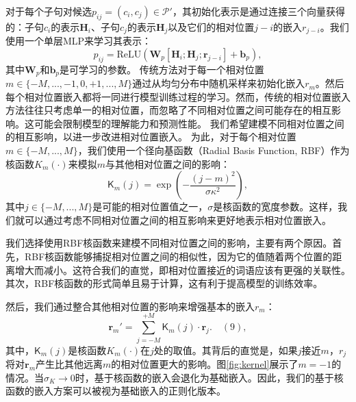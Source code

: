 对于每个子句对候选$p_{ij}=(c_i,c_j)\in\mathcal{P}'$，其初始化表示是通过连接三个向量获得的：子句$c_i$的表示$\boldsymbol{H}_i$、子句$c_j$的表示$\boldsymbol{H}_j$以及它们的相对位置$j-i$的嵌入$r_{j-i}$。我们使用一个单层MLP来学习其表示：
\vspace{3pt}  \begin{equation}
p_{ij}=\text{ReLU}(\boldsymbol{W}_p[\boldsymbol{H}_i;\boldsymbol{H}_j;\boldsymbol{r}_{j-i}]+\boldsymbol{b}_p),
\end{equation} \vspace{4pt}
其中$\boldsymbol{W}_p$和$\boldsymbol{b}_p$是可学习的参数。
传统方法对于每一个相对位置$m\in\{-M,...,-1,0,+1,...,M\}$通过从均匀分布中随机采样来初始化嵌入$r_m$。然后每个相对位置嵌入都将一同进行模型训练过程的学习。然而，传统的相对位置嵌入方法往往只考虑单一的相对位置，而忽略了不同相对位置之间可能存在的相互影响。这可能会限制模型的理解能力和预测性能。
我们希望建模不同相对位置之间的相互影响，以进一步改进相对位置嵌入。
为此，对于每个相对位置$m\in\{-M,...,M\}$，我们使用一个径向基函数（Radial Basis Function, RBF）作为核函数$K_m(\cdot)$来模拟$m$与其他相对位置之间的影响：
\vspace{3pt}  \begin{equation}
\mathsf{K}_m(j)=\exp\left(-\dfrac{(j-m)^2}{\sigma\kappa^2}\right),
\end{equation} \vspace{4pt}
其中$j\in\{-M,...,M\}$是可能的相对位置值之一，$\sigma$是核函数的宽度参数。这样，我们就可以通过考虑不同相对位置之间的相互影响来更好地表示相对位置嵌入。

我们选择使用RBF核函数来建模不同相对位置之间的影响，主要有两个原因。首先，RBF核函数能够捕捉相对位置之间的相似性，因为它的值随着两个位置的距离增大而减小。这符合我们的直觉，即相对位置接近的词语应该有更强的关联性。其次，RBF核函数的形式简单且易于计算，这有利于提高模型的训练效率。

然后，我们通过整合其他相对位置的影响来增强基本的嵌入$r_m$：
\vspace{3pt}  \begin{equation}
\boldsymbol{r}_m'=\sum\limits_{j=-M}^{+M}\mathsf{K}_m(j)\cdot\boldsymbol{r}_j.\quad(9),
\end{equation} \vspace{4pt}
其中，$\mathsf{K}_m(j)$是核函数$K_m(\cdot)$在$j$处的取值。其背后的直觉是，如果$j$接近$m$，$r_j$将对$\boldsymbol{r}_m$产生比其他远离$m$的相对位置更大的影响。图\ref{fig:kernel}展示了$m=-1$的情况。当$\sigma_K\rightarrow0$时，基于核函数的嵌入会退化为基础嵌入。因此，我们的基于核函数的嵌入方案可以被视为基础嵌入的正则化版本。


